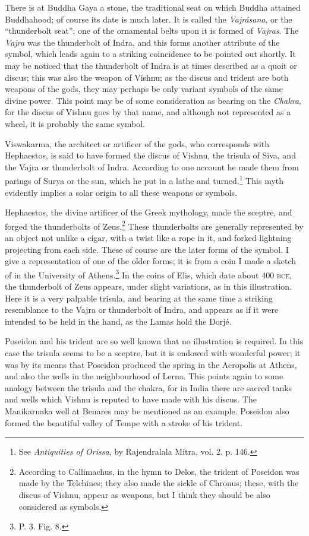 \documentclass[a4paper, 11pt, oneside, english, landscape, twocolumn]{article}
\begin{document}
There is at Buddha Gaya a stone, the traditional seat on which Buddha attained Buddhahood; of course its date is much later. It is called the \emph{Vajrásana}, or the ``thunderbolt seat''; one of the ornamental belts upon it is formed of \emph{Vajras}. The \emph{Vajra} was the thunderbolt of Indra, and this forms another attribute of the symbol, which leads again to a striking coincidence to be pointed out shortly. It may be noticed that the thunderbolt of Indra is at times described as a quoit or discus; this was also the weapon of Vishnu; as the discus and trident are both weapons of the gods, they may perhaps be only variant symbols of the same divine power. This point may be of some consideration as bearing on the \emph{Chakra}, for the discus of Vishnu goes by that name, and although not represented as a wheel, it is probably the same symbol.

Viswakarma, the architect or artificer of the gods, who corresponds with Hephaestos, is said to have formed the discus of Vishnu, the trisula of Siva, and the Vajra or thunderbolt of Indra. According to one account he made them from parings of Surya or the sun, which he put in a lathe and turned.\footnote{See \emph{Antiquities of Orissa}, by Rajendralala Mitra, vol. 2. p. 146.} This myth evidently implies a solar origin to all these weapons or symbols.

Hephaestos, the divine artificer of the Greek mythology, made the sceptre, and forged the thunderbolts of Zeus.\footnote{According to Callimachus, in the hymn to Delos, the trident of Poseidon was made by the Telchines; they also made the sickle of Chronus; these, with the discus of Vishnu, appear as weapons, but I think they should be also considered as symbols.} These thunderbolts are generally represented by an object not unlike a cigar, with a twist like a rope in it, and forked lightning projecting from each side. These of course are the later forms of the symbol. I give a representation of one of the older forms; it is from a coin I made a sketch of in the University of Athens.\footnote{P. 3. Fig. 8.} In the coins of Elis, which date about 400 \textsc{bce}, the thunderbolt of Zeus appears, under slight variations, as in this illustration. Here it is a very palpable trisula, and bearing at the same time a striking resemblance to the Vajra or thunderbolt of Indra, and appears as if it were intended to be held in the hand, as the Lamas hold the Dorjé.

Poseidon and his trident are so well known that no illustration is required. In this case the trisula seems to be a sceptre, but it is endowed with wonderful power; it was by its means that Poseidon produced the spring in the Acropolis at Athens, and also the wells in the neighbourhood of Lerna. This points again to some analogy between the trisula and the chakra, for in India there are sacred tanks and wells which Vishnu is reputed to have made with his discus. The Manikarnaka well at Benares may be mentioned as an example. Poseidon also formed the beautiful valley of Tempe with a stroke of his trident.
\end{document}
